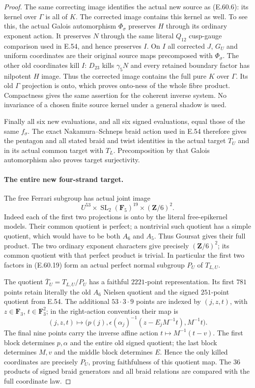 \begin{proof}
The same correcting image identifies the actual new
source as \textup{(E.60.6)}: its kernel over $\Gamma$
is all of $K$. The corrected image contains this
kernel as well. To see this, the actual Galois
automorphism $\Phi_\sigma$ preserves $H$ through its
ordinary exponent action. It preserves $N$ through the
same literal $Q_{12}$ cusp-gauge comparison used in
E.54, and hence preserves $I$.
On $I$ all corrected $J$, $G_U$ and uniform coordinates
are their original source maps precomposed with
$\Phi_\sigma$. The other old coordinates kill $I$:
$D_{23}$ kills $\gamma_5N$ and every retained boundary
factor has nilpotent $H$ image.
Thus the corrected image contains the full pure $K$
over $\Gamma$. Its old $\Gamma$ projection is onto,
which proves onto-ness of the whole fibre product.
Compactness gives the same assertion for the coherent
inverse system. No invariance of a chosen finite source
kernel under a general shadow is used.

Finally all six new evaluations, and all six signed
evaluations, equal those of the same $f_\sigma$.
The exact Nakamura--Schneps braid action used in E.54
therefore gives the pentagon and all stated braid and
twist identities in the actual target $T_U$ and in its
actual common target with $T_L$. Precomposition by that
Galois automorphism also proves target surjectivity.

\paragraph{The entire new four-strand target.}
The free Ferrari subgroup has actual joint image
\[
       U^{53}\times\operatorname{SL}_2(\mathbf F_5)^{19}
                    \times(\mathbf Z/6)^2.
 \tag{E.60.19}
\]
Indeed each of the first two projections is onto by
the literal free-epikernel models. Their common quotient
is perfect; a nontrivial such quotient has a simple
quotient, which would have to be both $A_6$ and $A_5$.
Thus Goursat gives their full product. The two ordinary
exponent characters give precisely $(\mathbf Z/6)^2$;
its common quotient with that perfect product is trivial.
In particular the first two factors in
\textup{(E.60.19)} form an actual perfect normal subgroup
$P_U$ of $T_{L,U}$.

The quotient $\overline T_U=T_{L,U}/P_U$ has a faithful
$2221$-point representation. Its first $781$ points
retain literally the old $A_6$ Nielsen quotient and
the signed $251$-point quotient from E.54. The additional
$53\cdot3\cdot9$ points are indexed by $(j,z,t)$,
with $z\in\mathbf F_3$, $t\in\mathbf F_3^2$;
in the right-action convention their map is
\[
 (j,z,t)\longmapsto
 \bigl(p(j),\epsilon(\alpha_j)^{-1}
                 (z-E_jM^{-1}t),M^{-1}t\bigr).
 \tag{E.60.20}
\]
The final nine points carry the inverse affine action
$t\mapsto M^{-1}(t-v)$. The first block determines
$p,\alpha$ and the entire old signed quotient; the
last block determines $M,v$ and the middle block
determines $E$. Hence the only killed coordinates
are precisely $P_U$, proving faithfulness of this
quotient map. The $36$ products of signed braid
generators and all braid relations are compared
with the full coordinate law.


\end{proof}
